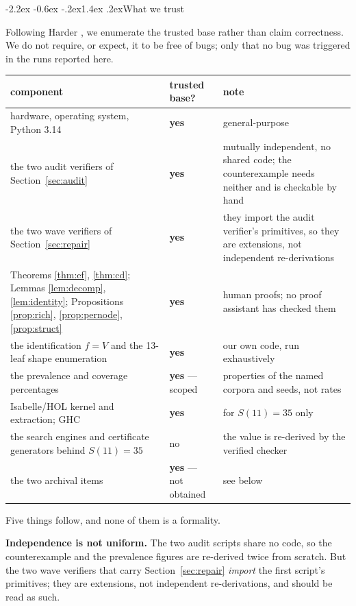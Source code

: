 \documentclass[11pt,a4paper]{article}
\makeatletter
\renewcommand\section{\@startsection{section}{1}{\z@}%
  {-2.2ex \@plus -0.6ex \@minus -.2ex}{1.4ex \@plus.2ex}{\normalfont\large\bfseries}}
\makeatother
\begin{document}
\section{What we trust}
\label{sec:trust}

Following Harder \cite{Ha20}, we enumerate the trusted base rather than claim
correctness. We do not require, or expect, it to be free of bugs; only that no
bug was triggered in the runs reported here.

\begin{center}
\small
\begin{tabular}{p{} p{} p{}}
\toprule
component & trusted base? & note \\
\midrule
hardware, operating system, Python 3.14 & \textbf{yes} & general-purpose \\
the two audit verifiers of Section~\ref{sec:audit} & \textbf{yes} & mutually
independent, no shared code; the counterexample needs neither and is checkable
by hand \\
the two wave verifiers of Section~\ref{sec:repair} & \textbf{yes} & they import
the audit verifier's primitives, so they are extensions, not independent
re-derivations \\
Theorems \ref{thm:ef}, \ref{thm:cd}; Lemmas \ref{lem:decomp},
\ref{lem:identity}; Propositions \ref{prop:rich}, \ref{prop:pernode},
\ref{prop:struct} & \textbf{yes} & human proofs; no proof assistant has checked
them \\
the identification $f = V$ and the 13-leaf shape enumeration & \textbf{yes} &
our own code, run exhaustively \\
the prevalence and coverage percentages & \textbf{yes} --- scoped &
properties of the named corpora and seeds, not rates \\
Isabelle/HOL kernel and extraction; GHC & \textbf{yes} & for $S(11) = 35$
only \\
the search engines and certificate generators behind $S(11) = 35$ & no & the
value is re-derived by the verified checker \cite{HaCert,Cert,P2} \\
the two archival items \cite{VV71,VV72a} & \textbf{yes} --- not obtained &
see below \\
\bottomrule
\end{tabular}
\end{center}

Five things follow, and none of them is a formality.

\textbf{Independence is not uniform.} The two audit scripts share no code, so
the counterexample and the prevalence figures are re-derived twice from
scratch. But the two wave verifiers that carry Section~\ref{sec:repair}
\emph{import} the first script's primitives; they are extensions, not
independent re-derivations, and should be read as such.
\end{document}
